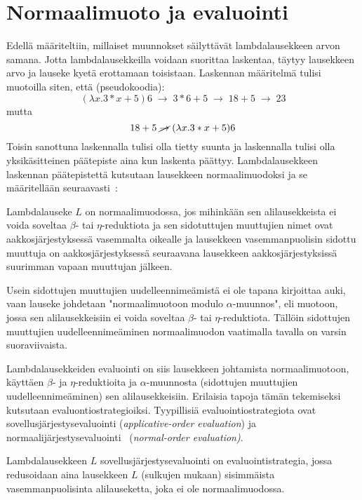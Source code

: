 \section{Normaalimuoto ja evaluointi}

Edellä määriteltiin, millaiset muunnokset säilyttävät lambdalausekkeen arvon samana. Jotta lambdalausekkeilla voidaan suorittaa laskentaa, täytyy lausekkeen arvo ja lauseke kyetä erottamaan toisistaan. Laskennan määritelmä tulisi muotoilla siten, että (pseudokoodia):
\[ 
(\lambda x. 3 * x + 5) 6 \; \rightarrow \; 3 * 6 + 5 \; \rightarrow \; 18 + 5 \; \rightarrow \; 23 
\]
mutta 
\[ 18 + 5 \; \cancel{\rightarrow} \; (\lambda x. 3 * x + 5) 6 \]
Toisin sanottuna laskennalla tulisi olla tietty suunta ja laskennalla tulisi olla yksikäsitteinen päätepiste aina kun laskenta päättyy. Lambdalausekkeen laskennan päätepistettä kutsutaan lausekkeen normaalimuodoksi ja se määritellään seuraavasti~\cite[s.~9]{Hudak89}: 

\begin{maar}[normaalimuoto]
Lambdalauseke $L$ on normaalimuodossa, jos mihinkään sen alilausekkeista ei voida soveltaa $\beta$- tai $\eta$-reduktiota ja sen sidotuttujen muuttujien nimet ovat aakkosjärjestyksessä vasemmalta oikealle ja lausekkeen vasemmanpuolisin sidottu muuttuja on aakkosjärjestyksessä seuraavana lausekkeen aakkosjärjestyksissä suurimman vapaan muuttujan jälkeen.  
\end{maar}

Usein sidottujen muuttujien uudelleennimeämistä ei ole tapana kirjoittaa auki, vaan lauseke johdetaan "normaalimuotoon modulo $\alpha$-muunnos", eli muotoon, jossa sen alilausekkeisiin ei voida soveltaa $\beta$- tai $\eta$-reduktiota. Tällöin sidottujen muuttujien uudelleennimeäminen normaalimuodon vaatimalla tavalla on varsin suoraviivaista.
\par
Lambdalausekkeiden evaluointi on siis lausekkeen johtamista normaalimuotoon, käyttäen $\beta$- ja $\eta$-reduktioita ja $\alpha$-muunnosta (sidottujen muuttujien uudelleennimeäminen) sen alilausekkeisiin. Erilaisia tapoja tämän tekemiseksi kutsutaan evaluontiostrategioiksi. Tyypillisiä evaluointiostrategiota ovat sovellusjärjestysevaluointi (\textit{applicative-order evaluation}) ja normaalijärjestysevaluointi~\cite[s.~ 10]{Hudak89} (\textit{normal-order evaluation)}.

\begin{alg}[sovellusjärjestysevaluointi] 
Lambdalausekkeen $L$ sovellusjärjestysevaluointi on evaluointistrategia, jossa redusoidaan aina lausekkeen $L$ (sulkujen mukaan) sisimmäista vasemmanpuolisinta alilauseketta, joka ei ole normaalimuodossa.
\end{alg}


